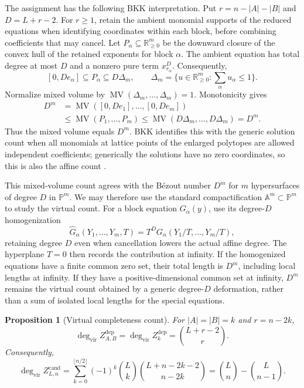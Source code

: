 \documentclass[11pt]{article}
\newtheorem{proposition}{Proposition}[section]
\theoremstyle{definition}
\begin{document}
The assignment has the following BKK interpretation. Put
$r=n-|A|-|B|$ and $D=L+r-2$. For $r\ge1$, retain the ambient monomial
supports of the reduced equations when identifying coordinates within
each block, before combining coefficients that may cancel. Let
$P_\alpha\subseteq\mathbb R_{\ge0}^m$ be the downward closure of the
convex hull of the retained exponents for block $\alpha$. The ambient
equation has total degree at most $D$ and a nonzero pure term
$x_{r_\alpha}^D$. Consequently,
\[
 [0,De_\alpha]\subseteq P_\alpha\subseteq D\Delta_m,
 \qquad
 \Delta_m=\{u\in\mathbb R_{\ge0}^m:\textstyle\sum_\alpha u_\alpha\le1\}.
\]
Normalize mixed volume by
$\operatorname{MV}(\Delta_m,\ldots,\Delta_m)=1$. Monotonicity gives
\[
 \begin{aligned}
 D^m
 &=\operatorname{MV}([0,De_1],\ldots,[0,De_m])\\
 &\le\operatorname{MV}(P_1,\ldots,P_m)
 \le\operatorname{MV}(D\Delta_m,\ldots,D\Delta_m)=D^m.
 \end{aligned}
\]
Thus the mixed volume equals $D^m$. BKK identifies this with the generic
solution count when all monomials at lattice points of the enlarged
polytopes are allowed independent coefficients; generically the
solutions have no zero coordinates, so this is also the affine count
\cite[Chapter~3]{Sturmfels}.

This mixed-volume count agrees with the B\'ezout number $D^m$ for
$m$ hypersurfaces of degree $D$ in $\mathbb P^m$. We may therefore use
the standard compactification $\mathbb A^m\subset\mathbb P^m$ to
study the virtual count. For a block equation $G_\alpha(y)$, use its
degree-$D$ homogenization
\[
 \widehat G_\alpha(Y_1,\ldots,Y_m,T)
 =T^D G_\alpha(Y_1/T,\ldots,Y_m/T),
\]
retaining degree $D$ even when cancellation lowers the actual affine
degree. The hyperplane $T=0$ then records the contribution at infinity.
If the homogenized equations have a finite common zero set, their
total length is $D^m$, including local lengths at infinity. If they
have a positive-dimensional common set at infinity, $D^m$ remains the
virtual count obtained by a generic degree-$D$ deformation, rather than
a sum of isolated local lengths for the special equations.

\begin{proposition}[Virtual completeness count]
\label{prop:virtual-completeness}
For $|A|=|B|=k$ and $r=n-2k$,
\begin{equation}\label{eq:virtual-depermutation-degree}
 \deg_{\mathrm{vir}}Z^{\mathrm{dep}}_{A,B}
 =\deg_{\mathrm{vir}}Z^{\mathrm{dep}}_k
 =\binom{L+r-2}{r}.
\end{equation}
Consequently,
\begin{equation}\label{eq:virtual-completeness-degree}
 \boxed{
 \deg_{\mathrm{vir}}Z^{\mathrm{cand}}_{L,n}
 =\sum_{k=0}^{\lfloor n/2\rfloor}(-1)^k\binom Lk
       \binom{L+n-2k-2}{n-2k}
 =\binom Ln-\binom L{n-1}.}
\end{equation}
\end{proposition}
\end{document}
